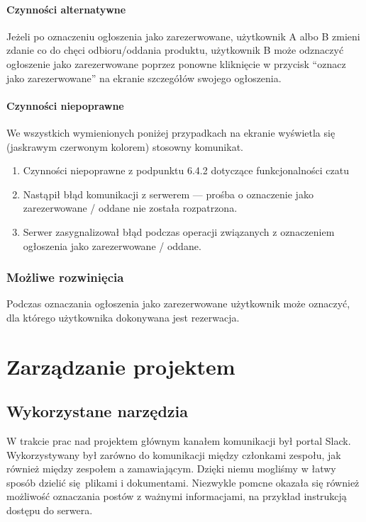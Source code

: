 \documentclass[licencjacka]{pracamgr}
\begin{document}
    \subsubsection{Czynności alternatywne}
    Jeżeli po oznaczeniu ogłoszenia jako zarezerwowane, użytkownik A albo B zmieni zdanie co do chęci odbioru/oddania produktu, użytkownik B może odznaczyć ogłoszenie jako zarezerwowane poprzez ponowne kliknięcie w przycisk ``oznacz jako zarezerwowane'' na ekranie szczegółów swojego ogłoszenia.
    \subsubsection{Czynności niepoprawne}
    We wszystkich wymienionych poniżej przypadkach na ekranie wyświetla się (jaskrawym czerwonym kolorem) stosowny komunikat.
    \begin{enumerate}
        \item Czynności niepoprawne z podpunktu 6.4.2 dotyczące funkcjonalności czatu
        \item Nastąpił błąd komunikacji z serwerem --- prośba o oznaczenie jako zarezerwowane / oddane nie została rozpatrzona.
        \item Serwer zasygnalizował błąd podczas operacji związanych z oznaczeniem ogłoszenia jako zarezerwowane / oddane.
    \end{enumerate}
    \subsection{Możliwe rozwinięcia}
    Podczas oznaczania ogłoszenia jako zarezerwowane użytkownik może oznaczyć, dla którego użytkownika dokonywana jest rezerwacja.

\chapter{Zarządzanie projektem}
\section{Wykorzystane narzędzia}

W trakcie prac nad projektem głównym kanałem komunikacji był portal Slack. Wykorzystywany był zarówno do komunikacji między członkami zespołu, jak również między zespołem a zamawiającym. Dzięki niemu mogliśmy w łatwy sposób dzielić się plikami i dokumentami. Niezwykle pomcne okazała się również możliwość oznaczania postów z ważnymi informacjami, na przykład instrukcją dostępu do serwera.
\end{document}
